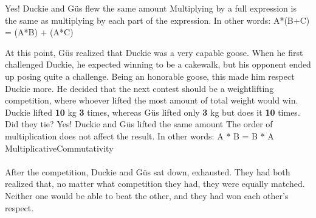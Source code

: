 \documentclass[a4paper,11pt ]{book}
\begin{document}
{Yes! Duckie and Güs flew the same amount}
{Multiplying by a full expression is the same as multiplying by each part of the expression. In other words: A*(B+C) = (A*B) + (A*C)}
{}
{At this point, Güs realized that Duckie was a very capable goose. When he first challenged Duckie, he expected winning to be a cakewalk, but his opponent ended up posing quite a challenge. Being an honorable goose, this made him respect Duckie more. He decided that the next contest should be a weightlifting competition, where whoever lifted the most amount of total weight would win. Duckie lifted \textbf{10} kg \textbf{3} times, whereas Güs lifted only \textbf{3} kg but does it \textbf{10} times. Did they tie?}
{Yes! Duckie and Güs lifted the same amount}
{The order of multiplication does not affect the result. In other words: A * B = B * A}
{MultiplicativeCommutativity}
\paragraph{} After the competition, Duckie and Güs sat down, exhausted. They had both realized that, no matter what competition they had, they were equally matched. Neither one would be able to beat the other, and they had won each other's respect. 
\end{document}
